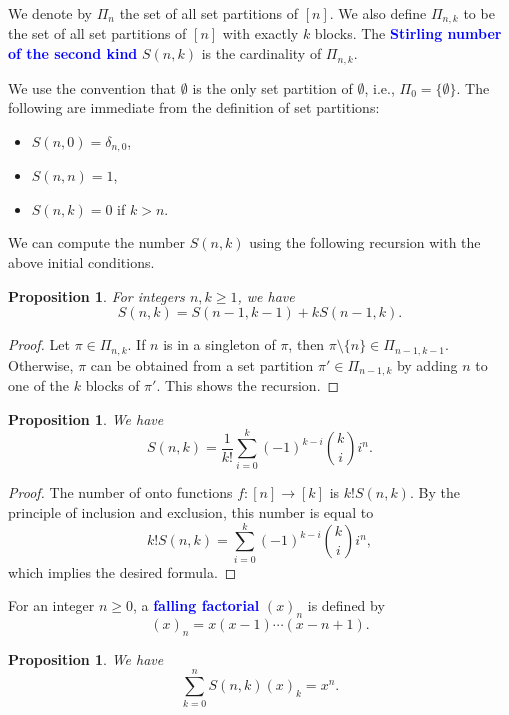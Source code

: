 \documentclass[oneside]{book}
\numberwithin{equation}{section}
\newtheorem{prop}[thm]{Proposition}
\theoremstyle{definition}
\renewcommand\emph[1]{\textcolor{blue}{\bf #1}}
\begin{document}
We denote by \( \Pi_n \) the set of all set partitions of \( [n] \).
We also define \( \Pi_{n,k} \) to be the set of all set partitions of
\( [n] \) with exactly \( k \) blocks. The \emph{Stirling number of
  the second kind} \( S(n,k) \) is the cardinality of \( \Pi_{n,k} \).

We use the convention that \( \emptyset \) is the only set partition
of \( \emptyset \), i.e., \( \Pi_0 = \{\emptyset\} \). The following
are immediate from the definition of set partitions:
\begin{itemize}
\item \( S(n,0) = \delta_{n,0} \),
\item \( S(n,n) = 1 \),
\item \( S(n,k) = 0 \) if \( k>n \).
\end{itemize}

We can compute the number \( S(n,k) \) using the following recursion
with the above initial conditions.

\begin{prop}
  For integers \( n,k\ge1 \), we have
  \[
    S(n,k) = S(n-1,k-1) + k S(n-1,k).
  \]
\end{prop}
\begin{proof}
  Let \( \pi\in \Pi_{n,k} \). If \( n \) is in a singleton of
  \( \pi \), then \( \pi\setminus\{n\} \in \Pi_{n-1,k-1} \). Otherwise,
  \( \pi \) can be obtained from a set partition
  \( \pi'\in \Pi_{n-1,k} \) by adding \( n \) to one of the \( k \)
  blocks of \( \pi' \). This shows the recursion.
\end{proof}


\begin{prop}
  We have
  \[
    S(n,k) = \frac{1}{k!} \sum_{i=0}^{k} (-1)^{k-i} \binom{k}{i}i^n.
  \]
\end{prop}

\begin{proof}
  The number of onto functions \( f:[n] \to [k] \) is \( k! S(n,k) \).
  By the principle of inclusion and exclusion, this number is equal to
  \[
     k! S(n,k) = \sum_{i=0}^{k} (-1)^{k-i} \binom{k}{i}i^n,
  \]
  which implies the desired formula.
\end{proof}

For an integer \( n\ge0 \), a \emph{falling factorial} \( (x)_n \) is defined by
\[
  (x)_n = x(x-1) \cdots (x-n+1).
\]

\begin{prop}
  We have
  \begin{equation}\label{eq:S(n,k)(x)k=xn}
    \sum_{k=0}^{n} S(n,k) (x)_k = x^n.
  \end{equation}
\end{prop}
\end{document}
